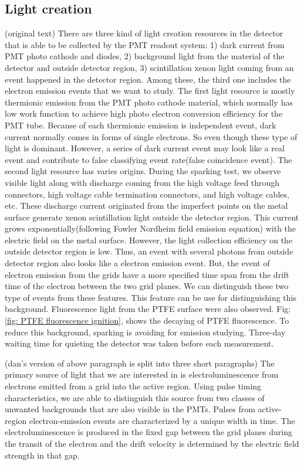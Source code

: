 \subsection{Light creation}
(original text) There are three kind of light creation resources in the detector that is able to be collected by the PMT readout system: 1) dark current from PMT photo cathode and diodes, 2) background light from the material of the detector and outside detector region, 3) scintillation xenon light coming from an event happened in the detector region. Among these, the third one includes the electron emission events that we want to study. The first light resource is mostly thermionic emission from the PMT photo cathode material, which normally has low work function to achieve high photo electron conversion efficiency for the PMT tube. Because of each thermionic emission is independent event, dark current normally comes in forms of single electrons. So even though these type of light is dominant. However, a series of dark current event may look like a real event and contribute to false classifying event rate(false coincidence event). The second light resource has varies origins. During the sparking test, we observe visible light along with discharge coming from the high voltage feed through connectors, high voltage cable termination connectors, and high voltage cables, etc. These discharge current originated from the imperfect points on the metal surface generate xenon scintillation light outside the detector region. This current grows exponentially(following Fowler Nordheim field emission equation) with the electric field on the metal surface. However, the light collection efficiency on the outside detector region is low. Thus, an event with several photons from outside detector region also looks like a electron emission event. But, the event of electron emission from the grids have a more specified time span from the drift time of the electron between the two grid planes. We can distinguish these two type of events from these features. This feature can be use for distinguishing this background. Fluorescence light from the PTFE surface were also observed. Fig: \ref{fig: PTFE fluorescence ignition}, shows the decaying of PTFE fluorescence. To reduce this background, sparking is avoiding for emission studying. Three-day waiting time for quieting the detector was taken before each measurement. 

(dan's version of above paragraph is split into three short paragraphs) The primary source of light that we are interested in is electroluminescence from electrons emitted from a grid into the active region. Using pulse timing characteristics, we are able to distinguish this source from two classes of unwanted backgrounds that are also visible in the PMTs. Pulses from active-region electron-emission events are characterized by a unique width in time. The electroluminescence is produced in the fixed gap between the grid planes during the transit of the electron and the drift velocity is determined by the electric field strength in that gap. 


